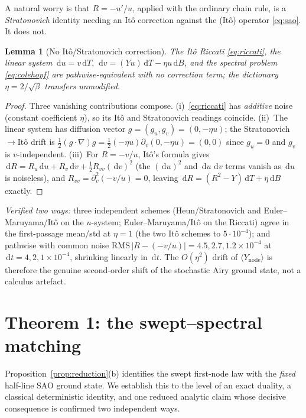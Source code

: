 \documentclass[11pt]{article}
\newtheorem{lemma}{Lemma}
\theoremstyle{remark}
\newcommand{\dd}{\,\mathrm{d}}
\newcommand{\Ynode}{Y_{\mathrm{node}}}
\begin{document}
A natural worry is that $R=-u'/u$, applied with the ordinary chain rule, is a
\emph{Stratonovich} identity needing an It\^o correction against the (It\^o) operator
\eqref{eq:sao}. It does not.

\begin{lemma}[No It\^o/Stratonovich correction]\label{lem:ito}
The It\^o Riccati \eqref{eq:riccati}, the linear system $\dd u=v\dd T,\ \dd
v=(Yu)\dd T-\eta u\dd B$, and the spectral problem \eqref{eq:colehopf} are
pathwise-equivalent with no correction term; the dictionary $\eta=2/\sqrt\beta$
transfers unmodified.
\end{lemma}

\begin{proof}
Three vanishing contributions compose. (i)~\eqref{eq:riccati} has \emph{additive}
noise (constant coefficient $\eta$), so its It\^o and Stratonovich readings coincide.
(ii)~The linear system has diffusion vector $g=(g_u,g_v)=(0,-\eta u)$; the
Stratonovich$\to$It\^o drift is $\tfrac12(g\!\cdot\!\nabla)g=\tfrac12(-\eta
u)\partial_v(0,-\eta u)=(0,0)$ since $g_u=0$ and $g_v$ is $v$-independent.
(iii)~For $R=-v/u$, It\^o's formula gives $\dd R=R_u\dd u+R_v\dd v+\tfrac12
R_{vv}(\dd v)^2$ (the $(\dd u)^2$ and $\dd u\,\dd v$ terms vanish as $\dd u$ is
noiseless), and $R_{vv}=\partial_v^2(-v/u)=0$, leaving
$\dd R=(R^2-Y)\dd T+\eta\dd B$ exactly.
\end{proof}

\emph{Verified two ways:} three independent schemes (Heun/Stratonovich and
Euler--Maruyama/It\^o on the $u$-system; Euler--Maruyama/It\^o on the Riccati) agree
in the first-passage mean/std at $\eta=1$ (the two It\^o schemes to $5\cdot10^{-4}$);
and pathwise with common noise $\mathrm{RMS}\,|R-(-v/u)|=4.5,2.7,1.2\times10^{-4}$ at
$\dd t=4,2,1\times10^{-4}$, shrinking linearly in $\dd t$. The $O(\eta^2)$ drift of
$\langle\Ynode\rangle$ is therefore the genuine second-order shift of the stochastic
Airy ground state, not a calculus artefact.

\section{Theorem 1: the swept--spectral matching}\label{sec:matching}

Proposition~\ref{prop:reduction}(b) identifies the swept first-node law with the
\emph{fixed} half-line SAO ground state. We establish this to the level of an exact
duality, a classical deterministic identity, and one reduced analytic claim whose
decisive consequence is confirmed two independent ways.
\end{document}
